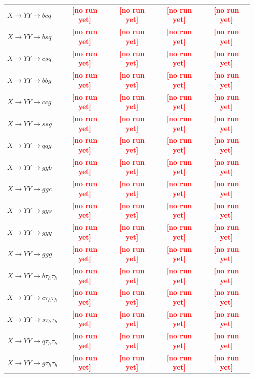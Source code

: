 \documentclass[12pt]{article}   %
\newcommand{\pending}[1]{\textcolor{red}{\textbf{[#1]}}}
\begin{document}
\begin{landscape}
{\begin{longtable}{@{\extracolsep{\fill}}lcccc@{}}
$X\to YY\to bcq$ & \pending{no run yet} & \pending{no run yet} & \pending{no run yet} & \pending{no run yet} \\
$X\to YY\to bsq$ & \pending{no run yet} & \pending{no run yet} & \pending{no run yet} & \pending{no run yet} \\
$X\to YY\to csq$ & \pending{no run yet} & \pending{no run yet} & \pending{no run yet} & \pending{no run yet} \\
$X\to YY\to bbg$ & \pending{no run yet} & \pending{no run yet} & \pending{no run yet} & \pending{no run yet} \\
$X\to YY\to ccg$ & \pending{no run yet} & \pending{no run yet} & \pending{no run yet} & \pending{no run yet} \\
$X\to YY\to ssg$ & \pending{no run yet} & \pending{no run yet} & \pending{no run yet} & \pending{no run yet} \\
$X\to YY\to qqg$ & \pending{no run yet} & \pending{no run yet} & \pending{no run yet} & \pending{no run yet} \\
$X\to YY\to ggb$ & \pending{no run yet} & \pending{no run yet} & \pending{no run yet} & \pending{no run yet} \\
$X\to YY\to ggc$ & \pending{no run yet} & \pending{no run yet} & \pending{no run yet} & \pending{no run yet} \\
$X\to YY\to ggs$ & \pending{no run yet} & \pending{no run yet} & \pending{no run yet} & \pending{no run yet} \\
$X\to YY\to ggq$ & \pending{no run yet} & \pending{no run yet} & \pending{no run yet} & \pending{no run yet} \\
$X\to YY\to ggg$ & \pending{no run yet} & \pending{no run yet} & \pending{no run yet} & \pending{no run yet} \\
\midrule
$X\to YY\to b\tau_h\tau_h$ & \pending{no run yet} & \pending{no run yet} & \pending{no run yet} & \pending{no run yet} \\
$X\to YY\to c\tau_h\tau_h$ & \pending{no run yet} & \pending{no run yet} & \pending{no run yet} & \pending{no run yet} \\
$X\to YY\to s\tau_h\tau_h$ & \pending{no run yet} & \pending{no run yet} & \pending{no run yet} & \pending{no run yet} \\
$X\to YY\to q\tau_h\tau_h$ & \pending{no run yet} & \pending{no run yet} & \pending{no run yet} & \pending{no run yet} \\
$X\to YY\to g\tau_h\tau_h$ & \pending{no run yet} & \pending{no run yet} & \pending{no run yet} & \pending{no run yet} \\

\end{longtable}}
\end{landscape}
\end{document}

